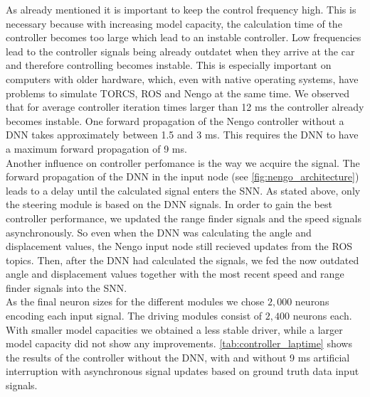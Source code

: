 \documentclass[10pt,a4paper,twoside,journal]{IEEEtran}
\begin{document}
%
%
As already mentioned it is important to keep the control frequency high. This is necessary because with increasing model capacity, the calculation time of the controller becomes too large which lead to an instable controller. Low frequencies lead to the controller signals being already outdatet when they arrive at the car and therefore controlling becomes instable. This is especially important on computers with older hardware, which, even with native operating systems, have problems to simulate TORCS, ROS and Nengo at the same time. We observed that for average controller iteration times larger than 12 ms the controller already becomes instable. One forward propagation of the Nengo controller without a DNN takes approximately between 1.5 and 3 ms. This requires the DNN to have a maximum forward propagation of 9 ms. \\
Another influence on controller perfomance is the way we acquire the signal. The forward propagation of the DNN in the input node (see \autoref{fig:nengo_architecture}) leads to a delay until the calculated signal enters the SNN. As stated above, only the steering module is based on the DNN signals. In order to gain the best controller performance, we updated the range finder signals and the speed signals asynchronously. So even when the DNN was calculating the angle and displacement values, the Nengo input node still recieved updates from the ROS topics. Then, after the DNN had calculated the signals, we fed the now outdated angle and displacement values together with the most recent speed and range finder signals into the SNN. \\
As the final neuron sizes for the different modules we chose $2,000$ neurons encoding each input signal. The driving modules consist of $2,400$ neurons each. With smaller model capacities we obtained a less stable driver, while a larger model capacity did not show any improvements. \autoref{tab:controller_laptime} shows the results of the controller without the DNN, with and without 9 ms artificial interruption with asynchronous signal updates based on ground truth data input signals. \\
\end{document}
